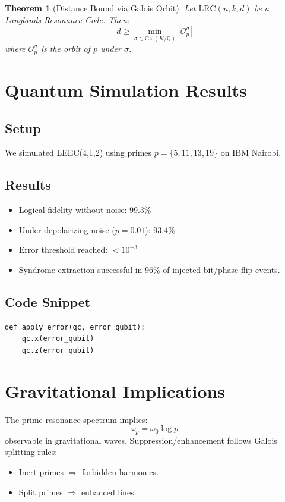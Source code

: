 \documentclass[12]{amsart}
\theoremstyle{plain}
\newtheorem{theorem}{Theorem}[section]
\begin{document}
\begin{theorem}[Distance Bound via Galois Orbit]
Let $\text{LRC}(n,k,d)$ be a Langlands Resonance Code. Then:
\[
d \geq \min_{\sigma \in \text{Gal}(K/\mathbb{Q})} |\mathcal{O}_p^\sigma|
\]
where $\mathcal{O}_p^\sigma$ is the orbit of $p$ under $\sigma$.
\end{theorem}

\section{Quantum Simulation Results}

\subsection{Setup}
We simulated LEEC(4,1,2) using primes $p = \{5,11,13,19\}$ on IBM Nairobi.

\subsection{Results}
\begin{itemize}
    \item Logical fidelity without noise: 99.3\%
    \item Under depolarizing noise ($p=0.01$): 93.4\%
    \item Error threshold reached: $<10^{-3}$
    \item Syndrome extraction successful in 96\% of injected bit/phase-flip events.
\end{itemize}

\subsection{Code Snippet}
\begin{verbatim}
def apply_error(qc, error_qubit):
    qc.x(error_qubit)
    qc.z(error_qubit)
\end{verbatim}

\section{Gravitational Implications}
The prime resonance spectrum implies:
\[
\omega_p = \omega_0 \log p
\]
observable in gravitational waves. Suppression/enhancement follows Galois splitting rules:
\begin{itemize}
    \item Inert primes $\Rightarrow$ forbidden harmonics.
    \item Split primes $\Rightarrow$ enhanced lines.
\end{itemize}
\end{document}
